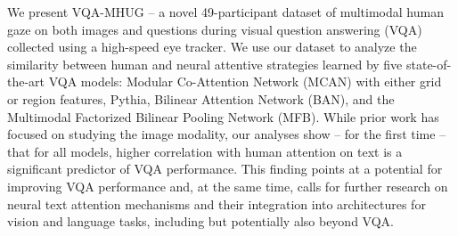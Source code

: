 We present VQA-MHUG -- a novel 49-participant dataset of multimodal human gaze on both images and questions during visual question answering (VQA) collected using a high-speed eye tracker. We use our dataset to analyze the similarity between human and neural attentive strategies learned by five state-of-the-art VQA models: Modular Co-Attention Network (MCAN) with either grid or region features, Pythia, Bilinear Attention Network (BAN), and the Multimodal Factorized Bilinear Pooling Network (MFB). While prior work has focused on studying the image modality, our analyses show -- for the first time -- that for all models, higher correlation with human attention on text is a significant predictor of VQA performance. This finding points at a potential for improving VQA performance and, at the same time, calls for further research on neural text attention mechanisms and their integration into architectures for vision and language tasks, including but potentially also beyond VQA.
